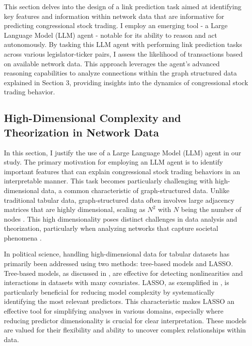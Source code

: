 \documentclass[15pt,letterpaper]{article}
\begin{document}
This section delves into the design of a link prediction task aimed at identifying key features and information within network data that are informative for predicting congressional stock trading. 
I employ an emerging tool - a Large Language Model (LLM) agent - notable for its ability to reason and act autonomously. 
By tasking this LLM agent with performing link prediction tasks across various legislator-ticker pairs, I assess the likelihood of transactions based on available network data. 
This approach leverages the agent's advanced reasoning capabilities to analyze connections within the graph structured data explained in Section 3, providing insights into the dynamics of congressional stock trading behavior.

\subsection{High-Dimensional Complexity and Theorization in Network Data}

In this section, I justify the use of a Large Language Model (LLM) agent in our study. The primary motivation for employing an LLM agent is to identify important features that can explain congressional stock trading behaviors in an interpretable manner. This task becomes particularly challenging with high-dimensional data, a common characteristic of graph-structured data. Unlike traditional tabular data, graph-structured data often involves large adjacency matrices that are highly dimensional, scaling as \( N^2 \) with \( N \) being the number of nodes \citep{Ward2011NetworkAA}.
This high dimensionality poses distinct challenges in data analysis and theorization, particularly when analyzing networks that capture societal phenomena \citep{Tang2012FeatureSW, Thi2013FeaturesEF}. 

In political science, handling high-dimensional data for tabular datasets has primarily 
been addressed using two methods: tree-based models and LASSO.
Tree-based models, as discussed in \cite{Montgomery}, are effective for detecting nonlinearities and interactions 
in datasets with many covariates. 
LASSO, as exemplified in \cite{lasso2}, is particularly beneficial for reducing model complexity by systematically identifying the most relevant predictors. This characteristic makes LASSO an effective tool for simplifying analyses in various domains, especially where reducing predictor dimensionality is crucial for clear interpretation.
These models are valued for their flexibility and ability to uncover complex relationships within data. 
\end{document}
